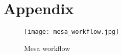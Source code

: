 
\chapter{Appendix}

\begin{figure}[htb]
    \centering
    \texttt{[image: mesa\_workflow.jpg]}
    \caption{Mesa workflow}
    \label{fig:mesa_workflow}
\end{figure}

% 
